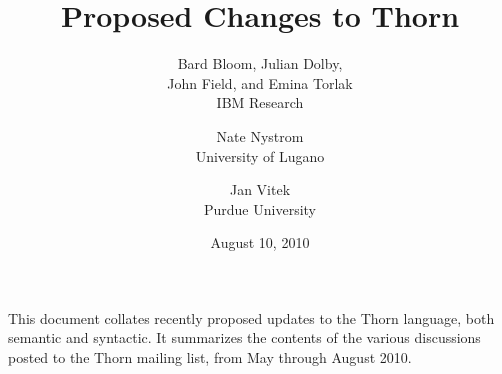 \documentclass[10pt,twocolumn]{article}
\title{Proposed Changes to Thorn}
\date{August 10, 2010}
\author{Bard Bloom, Julian Dolby, \\ John Field, and Emina Torlak \\ IBM Research \and Nate Nystrom \\ University of Lugano \and Jan Vitek \\ Purdue University }
\begin{document}
\maketitle 

This document collates recently proposed updates to the Thorn language, both semantic and syntactic.  It summarizes the contents of the various discussions posted to the Thorn mailing list, from May through August 2010.

\tableofcontents


\newpage

\newpage

\newpage

\end{document}
